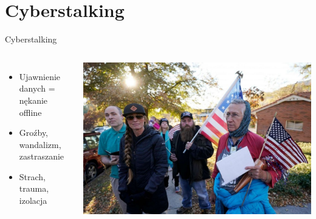 \section{Cyberstalking}
\begin{frame}{Cyberstalking}
\begin{columns}[c]
    \begin{itemize}
      \item Ujawnienie danych = nękanie offline
      \item Groźby, wandalizm, zastraszanie
      \item Strach, trauma, izolacja
    \end{itemize}
    \includegraphics[width=1\textwidth]{images/lockdown.jpg}
\end{columns}
\end{frame}

